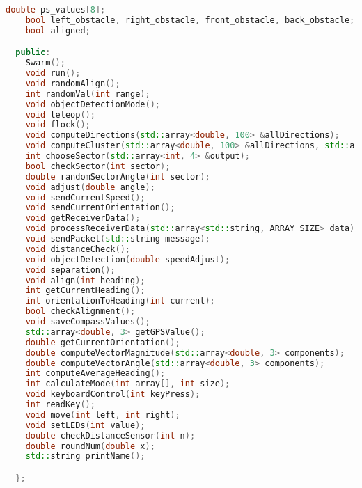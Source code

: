 \begin{lstlisting}[language=C++, caption={swarm.hpp},label={lst:swarm-header}]
    double ps_values[8];
    bool left_obstacle, right_obstacle, front_obstacle, back_obstacle;
    bool aligned;

  public:
    Swarm();
    void run();
    void randomAlign();
    int randomVal(int range);
    void objectDetectionMode();
    void teleop();
    void flock();
    void computeDirections(std::array<double, 100> &allDirections);
    void computeCluster(std::array<double, 100> &allDirections, std::array<int, 4> &output);
    int chooseSector(std::array<int, 4> &output);
    bool checkSector(int sector);
    double randomSectorAngle(int sector);
    void adjust(double angle);
    void sendCurrentSpeed();
    void sendCurrentOrientation();
    void getReceiverData();
    void processReceiverData(std::array<std::string, ARRAY_SIZE> data);
    void sendPacket(std::string message);
    void distanceCheck();
    void objectDetection(double speedAdjust);
    void separation();
    void align(int heading);
    int getCurrentHeading();
    int orientationToHeading(int current);
    bool checkAlignment();
    void saveCompassValues();
    std::array<double, 3> getGPSValue();
    double getCurrentOrientation();
    double computeVectorMagnitude(std::array<double, 3> components);
    double computeVectorAngle(std::array<double, 3> components);
    int computeAverageHeading();
    int calculateMode(int array[], int size);
    void keyboardControl(int keyPress);
    int readKey();
    void move(int left, int right);
    void setLEDs(int value);
    double checkDistanceSensor(int n);
    double roundNum(double x);
    std::string printName();

  };
\end{lstlisting}
